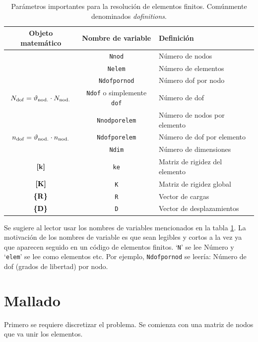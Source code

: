 \begin{table}[htb!]
	\centering
	\begin{tabular}{ccl}
		Objeto matemático & Nombre de variable & Definición \\ \hline
	\Nnod	& \texttt{Nnod}                   &    Número de nodos        \\
	\Nelem	& \texttt{Nelem}                   &    Número de elementos       \\
	\Ndofpornod	& \texttt{Ndofpornod}                   &    Número dof por nodo       \\
	$N_{\mathrm{dof}}=\vartheta_{\mathrm{nod.}} \cdot N_{\mathrm{nod.}}$	& \texttt{Ndof} {\footnotesize{}o simplemente} \texttt{dof}                   &    Número de dof        \\
	\Nnodporelem	& \texttt{Nnodporelem}                   &    Número de nodos por elemento     \\
	$n_{\mathrm{dof}}= \vartheta_{\mathrm{nod.}} \cdot n_{\mathrm{nod.}}$	& \texttt{Ndofporelem}                   &    Número de dof por elemento       \\
	\Ndims	& \texttt{Ndim}                   &    Número de dimensiones      \\
	$\boldsymbol{[}\mathbf{k} \boldsymbol{]}$	& \texttt{ke}                   &   Matriz de rigidez del elemento      \\
	$\boldsymbol{[}\mathbf{K} \boldsymbol{]}$	& \texttt{K}                   &   Matriz de rigidez global      \\
	$\boldsymbol{\{ }\mathbf{R} \boldsymbol{\}}$   & \texttt{R}                  &  Vector de cargas \\
	$\boldsymbol{\{ }\mathbf{D} \boldsymbol{\}}$   & \texttt{D}                 & Vector de desplazamientos \\
	\end{tabular}

\caption{Parámetros importantes para la resolución de elementos finitos. Comúnmente denominados \textit{dofinitions}.}
\label{tab:VariableDefinitions}
\end{table}

Se sugiere al lector usar los nombres de variables mencionados en la tabla \ref{tab:VariableDefinitions}. La motivación de los nombres de variable es que sean legibles y cortos a la vez ya que aparecen seguido en un código de elementos finitos. `\texttt{N}' se lee Número y `\texttt{elem}' se lee como elementos etc. Por ejemplo, \texttt{Ndofpornod} se leería: Número de dof (grados de libertad) por nodo.

\section{Mallado}
Primero se requiere discretizar el problema. Se comienza con una matriz de nodos que va unir los elementos. 

